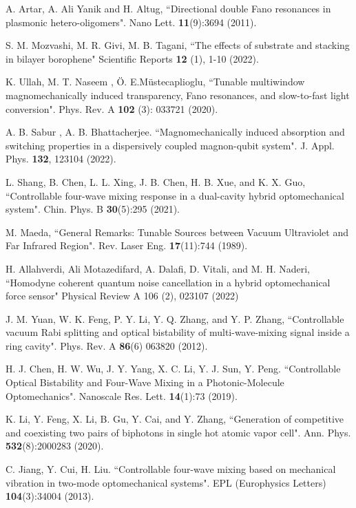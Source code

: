\documentclass[aps,pra,superscriptaddress,balancelastpage,twocolumn]{revtex4}
\begin{document}
\begin{thebibliography}{99}
 A. Artar, A. Ali Yanik and H. Altug, ``Directional double Fano
resonances in plasmonic hetero-oligomers". Nano Lett. \textbf{11}(9):3694
(2011).

 S. M. Mozvashi, M. R. Givi, M. B. Tagani, ``The effects of
substrate and stacking in bilayer borophene" Scientific Reports \textbf{12}
(1), 1-10 (2022).

 K. Ullah, M. T. Naseem , \"{O}. E.M\"{u}stecaplioglu,
``Tunable multiwindow magnomechanically induced transparency, Fano
resonances, and slow-to-fast light conversion". Phys. Rev. A \textbf{102}%
(3): 033721 (2020).

 A. B. Sabur , A. B. Bhattacherjee. ``Magnomechanically
induced absorption and switching properties in a dispersively coupled
magnon-qubit system". J. Appl. Phys. \textbf{132}, 123104 (2022).

 L. Shang, B. Chen, L. L. Xing, J. B. Chen, H. B. Xue, and K.
X. Guo, ``Controllable four-wave mixing response in a dual-cavity hybrid
optomechanical system". Chin. Phys. B \textbf{30}(5):295 (2021).

 M. Maeda, ``General Remarks: Tunable Sources between Vacuum
Ultraviolet and Far Infrared Region". Rev. Laser Eng. \textbf{17}(11):744
(1989).

 H. Allahverdi, Ali Motazedifard, A. Dalafi, D. Vitali, and
M. H. Naderi, ``Homodyne coherent quantum noise cancellation in a hybrid
optomechanical force sensor" Physical Review A 106 (2), 023107 (2022)

 J. M. Yuan, W. K. Feng, P. Y. Li, Y. Q. Zhang, and Y. P.
Zhang, ``Controllable vacuum Rabi splitting and optical bistability of
multi-wave-mixing signal inside a ring cavity". Phys. Rev. A \textbf{86}(6)
063820 (2012).

 H. J. Chen, H. W. Wu, J. Y. Yang, X. C. Li, Y. J. Sun, Y.
Peng. ``Controllable Optical Bistability and Four-Wave Mixing in a
Photonic-Molecule Optomechanics". Nanoscale Res. Lett. \textbf{14}(1):73
(2019).

 K. Li, Y. Feng, X. Li, B. Gu, Y. Cai, and Y. Zhang,
``Generation of competitive and coexisting two pairs of biphotons in single
hot atomic vapor cell". Ann. Phys. \textbf{532}(8):2000283 (2020).

 C. Jiang, Y. Cui, H. Liu. ``Controllable four-wave mixing
based on mechanical vibration in two-mode optomechanical systems". EPL
(Europhysics Letters) \textbf{104}(3):34004 (2013).


\end{thebibliography}
\end{document}
